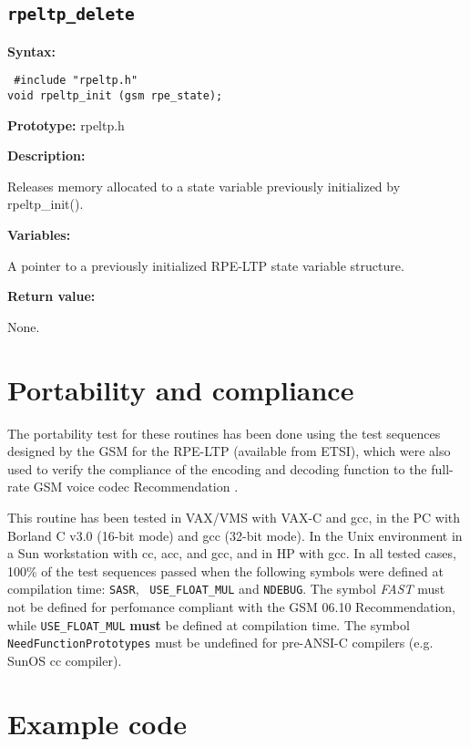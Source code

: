 \subsection{{\tt rpeltp\_delete}}

{\bf Syntax: }

{\tt
\#include "rpeltp.h"\\
void rpeltp\_init (gsm rpe\_state);
}

{\bf Prototype: }    rpeltp.h

{\bf Description: }

Releases memory allocated to a state variable previously
initialized by rpeltp\_init().

{\bf Variables: }
\begin{Descr}{\DescrLen}
\item[\pbox{20mm}{\em rpe\_state}] %
        A pointer to a previously initialized RPE-LTP state variable
        structure.
\end{Descr}

{\bf Return value: }

None.


\section{Portability and compliance}

The portability test for these routines has been done using
the test sequences designed by the GSM for the RPE-LTP
(available from ETSI), which were also used to verify the compliance of
the encoding and decoding function to the full-rate GSM voice codec
Recommendation \cite[Annex C]{GSM-06.10}.

This routine has been tested in VAX/VMS with VAX-C and gcc, in the PC
with Borland C v3.0 (16-bit mode) and gcc (32-bit mode). In the Unix
environment in a Sun workstation with cc, acc, and gcc, and in HP with
gcc. In all tested cases, 100\% of the test sequences passed when the
following symbols were defined at compilation time: {\tt SASR}, {\tt
USE\_FLOAT\_MUL} and {\tt NDEBUG}. The symbol {\em FAST} must not be
defined for perfomance compliant with the GSM 06.10 Recommendation,
while {\tt USE\_FLOAT\_MUL} {\bf must} be defined at compilation
time. The symbol {\tt NeedFunctionPrototypes} must be undefined for
pre-ANSI-C compilers (e.g. SunOS cc compiler).


\section{Example code}

